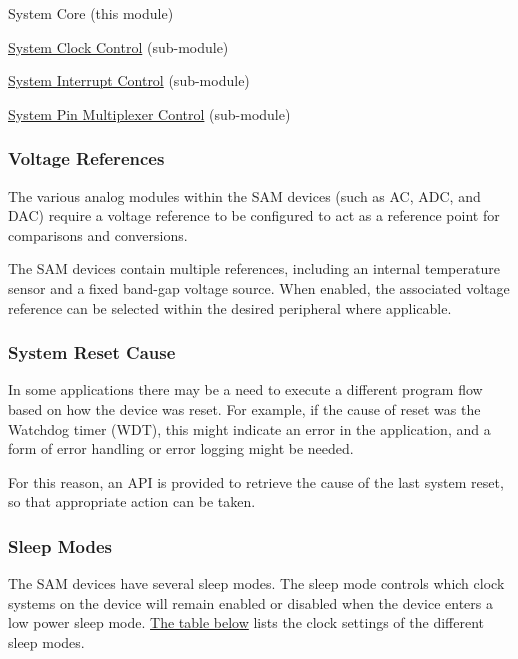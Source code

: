 \begin{DoxyItemize}
\item System Core (this module)
\item \hyperlink{group__asfdoc__sam0__system__clock__group}{System Clock Control} (sub-\/module)
\item \hyperlink{group__asfdoc__sam0__system__interrupt__group}{System Interrupt Control} (sub-\/module)
\item \hyperlink{group__asfdoc__sam0__system__pinmux__group}{System Pin Multiplexer Control} (sub-\/module)
\end{DoxyItemize}\hypertarget{group__asfdoc__sam0__system__group_asfdoc_sam0_system_module_overview_vref}{}\subsubsection{Voltage References}\label{group__asfdoc__sam0__system__group_asfdoc_sam0_system_module_overview_vref}
The various analog modules within the S\+A\+M devices (such as A\+C, A\+D\+C, and D\+A\+C) require a voltage reference to be configured to act as a reference point for comparisons and conversions.

The S\+A\+M devices contain multiple references, including an internal temperature sensor and a fixed band-\/gap voltage source. When enabled, the associated voltage reference can be selected within the desired peripheral where applicable.\hypertarget{group__asfdoc__sam0__system__group_asfdoc_sam0_system_module_overview_reset_cause}{}\subsubsection{System Reset Cause}\label{group__asfdoc__sam0__system__group_asfdoc_sam0_system_module_overview_reset_cause}
In some applications there may be a need to execute a different program flow based on how the device was reset. For example, if the cause of reset was the Watchdog timer (W\+D\+T), this might indicate an error in the application, and a form of error handling or error logging might be needed.

For this reason, an A\+P\+I is provided to retrieve the cause of the last system reset, so that appropriate action can be taken.\hypertarget{group__asfdoc__sam0__system__group_asfdoc_sam0_system_module_overview_sleep_mode}{}\subsubsection{Sleep Modes}\label{group__asfdoc__sam0__system__group_asfdoc_sam0_system_module_overview_sleep_mode}
The S\+A\+M devices have several sleep modes. The sleep mode controls which clock systems on the device will remain enabled or disabled when the device enters a low power sleep mode. \hyperlink{group__asfdoc__sam0__system__group_asfdoc_sam0_system_module_sleep_mode_table}{The table below} lists the clock settings of the different sleep modes.


